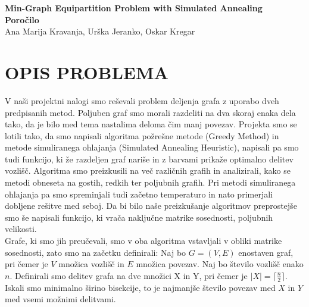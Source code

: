 \documentclass[12pt,a4paper]{amsart}
\theoremstyle{definition} %
\theoremstyle{plain} %
\newcommand{\naslovdela}{Min-Graph Equipartition Problem with Simulated Annealing}
\newcommand{\letnica}{2019}
\begin{document}
\thispagestyle{empty}
\vfill

\begin{center}{\large
{\bf \naslovdela}\\[10mm]
{\bf Poročilo}\\[10mm]
Ana Marija Kravanja, Urška Jeranko, Oskar Kregar}\\[1cm]

\end{center}
\vfill

\noindent{\large
Ljubljana, \letnica}
\pagebreak

\tableofcontents

\pagebreak

\section{\textbf{OPIS PROBLEMA}}
V naši projektni nalogi smo reševali problem deljenja grafa z uporabo dveh predpisanih metod. Poljuben graf smo morali razdeliti na dva skoraj enaka dela tako, da je bilo med tema nastalima deloma čim manj povezav. Projekta smo se lotili tako, da smo napisali algoritma požrešne metode (Greedy Method) in metode simuliranega ohlajanja (Simulated Annealing Heuristic), napisali pa smo tudi funkcijo, ki že razdeljen graf nariše in z barvami prikaže optimalno delitev vozlišč. Algoritma smo preizkusili na več različnih grafih in analizirali, kako se metodi obneseta na gostih, redkih ter poljubnih grafih. Pri metodi simuliranega ohlajanja pa smo spreminjali tudi začetno temperaturo in nato primerjali dobljene rešitve med seboj. Da bi bilo naše preizkušanje algoritmov preprostejše smo še napisali funkcijo, ki vrača naključne matrike sosednosti, poljubnih velikosti. \\

Grafe, ki smo jih preučevali, smo v oba algoritma vstavljali v obliki matrike sosednosti, zato smo na začetku definirali: Naj bo $G=(V,E)$ enostaven graf, pri čemer je $V$ množica vozlišč in $E$ množica povezav. Naj bo število vozlišč enako $n$. Definirali smo delitev grafa na dve množici X in Y, pri čemer je $|X| = \lceil \frac{n}{2} \rceil$. Iskali smo minimalno širino bisekcije, to je najmanjše število povezav med $X$ in $Y$ med vsemi možnimi delitvami. \\
\end{document}
